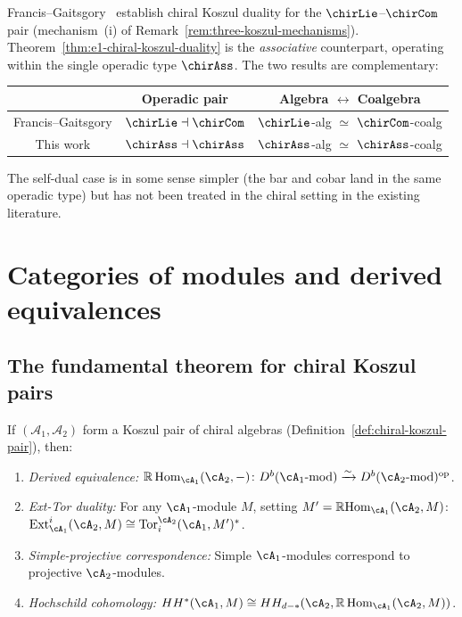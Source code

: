 \begin{remark}\label{rem:FG-comparison}
Francis--Gaitsgory~\cite{FG12} establish chiral Koszul duality for
the $\chirLie$--$\chirCom$ pair (mechanism~(i) of
Remark~\ref{rem:three-koszul-mechanisms}).
Theorem~\ref{thm:e1-chiral-koszul-duality} is the \emph{associative}
counterpart, operating within the single operadic type $\chirAss$.
The two results are complementary:
\begin{center}
\begin{tabular}{c|c|c}
& \textbf{Operadic pair} & \textbf{Algebra $\leftrightarrow$ Coalgebra} \\
\hline
Francis--Gaitsgory & $\chirLie \dashv \chirCom$ &
   $\chirLie$-alg $\simeq$ $\chirCom$-coalg \\
This work & $\chirAss \dashv \chirAss$ &
   $\chirAss$-alg $\simeq$ $\chirAss$-coalg
\end{tabular}
\end{center}
The self-dual case is in some sense simpler (the bar and cobar
land in the same operadic type) but has not been treated in the
chiral setting in the existing literature.
\end{remark}


\section{Categories of modules and derived equivalences}

\subsection{The fundamental theorem for chiral Koszul pairs}

\begin{theorem}
\label{thm:module-category-equivalence}
If $(\mathcal{A}_1, \mathcal{A}_2)$ form a Koszul pair of chiral algebras
(Definition~\ref{def:chiral-koszul-pair}), then:

\begin{enumerate}
\item \emph{Derived equivalence:}
$\mathbb{R}\operatorname{Hom}_{\cA_1}(\cA_2, -)\colon D^b(\cA_1\text{-mod}) \xrightarrow{\sim} D^b(\cA_2\text{-mod})^{\mathrm{op}}$.

\item \emph{Ext-Tor duality:} For any $\cA_1$-module $M$, setting $M' = \mathbb{R}\mathrm{Hom}_{\cA_1}(\cA_2, M)$:
$\operatorname{Ext}^i_{\cA_1}(\cA_2, M) \cong \operatorname{Tor}_i^{\cA_2}(\cA_1, M')^*$.

\item \emph{Simple-projective correspondence:}
Simple $\cA_1$-modules correspond to projective $\cA_2$-modules.

\item \emph{Hochschild cohomology:}
$HH^*(\cA_1, M) \cong HH_{d-*}(\cA_2, \mathbb{R}\operatorname{Hom}_{\cA_1}(\cA_2, M))$.
\end{enumerate}
\end{theorem}

